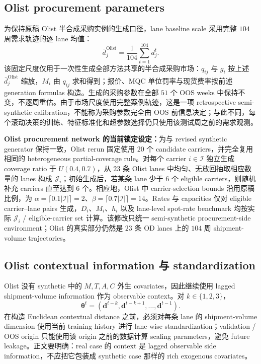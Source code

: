 \documentclass[11pt,a4paper]{ctexart}
\newcommand{\I}{\mathcal I}
\newcommand{\J}{\mathcal J}
\begin{document}
\subsection{Olist procurement parameters}

为保持原稿 Olist 半合成采购实例的生成口径，lane baseline scale 采用完整 $104$ 周需求轨迹的逐 lane 均值：
\[
\bar d_j^{\mathrm{Olist}}=\frac1{104}\sum_{t=1}^{104}d_j^t.
\]
该固定尺度仅用于一次性生成全部方法共享的半合成采购市场：$q_{ij}$ 与 $g_i$ 按上述 $\bar d_j^{\mathrm{Olist}}$ 缩放，$M_i$ 由 $q_{ij}$ 求和得到；报价、MQC 单位罚率与现货费率按前述 generation formulas 构造。生成的采购参数在全部 $51$ 个 OOS weeks 中保持不变，不逐周重估。由于市场尺度使用完整案例轨迹，这是一项 retrospective semi-synthetic calibration，不能称为采购参数完全由 OOS 前信息决定；与此不同，每个滚动决策的训练、特征标准化和超参数选择仍只使用该测试周之前的需求观测。

\textbf{Olist procurement network 的当前锁定设定：}为与 revised synthetic generator 保持一致，Olist rerun 固定使用 $20$ 个 candidate carriers，并完全复用相同的 heterogeneous partial-coverage rule。对每个 carrier $i\in\I$ 独立生成 coverage ratio 于 $U(0.4,0.7)$，从 $23$ 条 Olist lanes 中均匀、无放回抽取相应数量的 lanes 构成 $\J_i$；初始生成后，若某条 lane 少于 $6$ 个 eligible carriers，则随机补充 carriers 直至达到 $6$ 个。相应地，Olist 中 carrier-selection bounds 沿用原稿比例，为 $\alpha=\lceil0.1|\I|\rceil=2$、$\beta=\lceil0.7|\I|\rceil=14$。Rates 与 capacities 仅对 eligible carrier--lane pairs 生成，$D_i$、$M_i$、$h_i$ 以及 lane-level spot-rate benchmark 均按实际 $\J_i$ / eligible-carrier set 计算。该修改只统一 semi-synthetic procurement-side environment；Olist 的真实部分仍然是 $23$ 条 OD lanes 上的 $104$ 周 shipment-volume trajectories。

\subsection{Olist contextual information 与 standardization}

Olist 没有 synthetic 中的 $M,T,A,C$ 外生 covariates，因此继续使用 lagged shipment-volume information 作为 observable context。对 $k\in\{1,2,3\}$，
\[
\boldsymbol\theta^t
=\left(\boldsymbol d^{t-k},\boldsymbol d^{t-k+1},\ldots,\boldsymbol d^{t-1}\right).
\]
在构造 Euclidean contextual distance 之前，必须对每条 lane 的 shipment-volume dimension 使用当前 training history 进行 lane-wise standardization；validation / OOS origin 只能使用该 origin 之前的数据计算 scaling parameters，避免 future leakage。正文要明确：real case 的 context 是 lagged observable side information，不应把它包装成 synthetic case 那样的 rich exogenous covariates。
\end{document}
